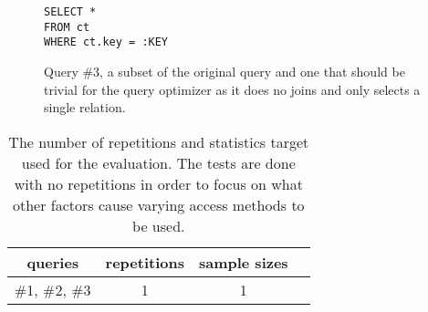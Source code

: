 \begin{figure}[ht]
\begin{verbatim}
SELECT *
FROM ct
WHERE ct.key = :KEY
\end{verbatim}
  \caption[Query \#3, used for the second evaluation]{Query \#3, a subset of the
  original query and one that should be trivial for the query optimizer as it
  does no joins and only selects a single relation.}\label{fig:sql:query3}
\end{figure}

\begin{table}
  \begin{center}
    \begin{tabu} {c c c c}
      \toprule
      queries & repetitions & sample sizes \\
      \midrule
      \#1, \#2, \#3  & 1 & 1 \\
      \bottomrule
    \end{tabu}
    \caption[The number of repetitions and statistics target used for second evaluation]{The
      number of repetitions and statistics target used for the evaluation. The
      tests are done with no repetitions in order to focus on what other factors
      cause varying access methods to be used.}\label{table:evaluation2}
  \end{center}
\end{table}